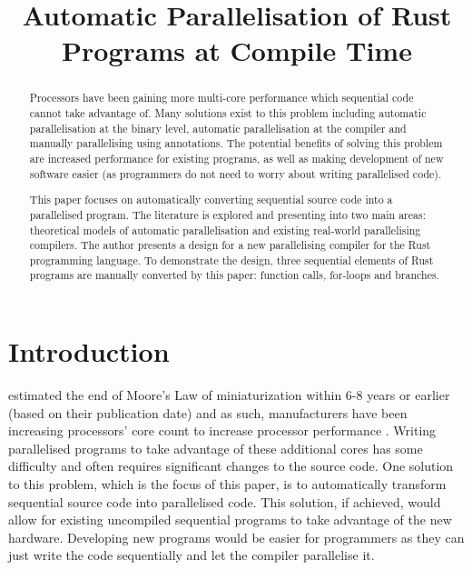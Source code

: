 \documentclass[conference]{IEEEtran}
\begin{document}
\title{Automatic Parallelisation of Rust Programs at Compile Time}

\author{
\and
{}
}

\maketitle

\begin{abstract}
  Processors have been gaining more multi-core performance which sequential code cannot take advantage of. Many solutions exist to this problem including automatic parallelisation at the binary level, automatic parallelisation at the compiler and manually parallelising using annotations. The potential benefits of solving this problem are increased performance for existing programs, as well as making development of new software easier (as programmers do not need to worry about writing parallelised code).

  This paper focuses on automatically converting sequential source code into a parallelised program. The literature is explored and presenting into two main areas: theoretical models of automatic parallelisation and existing real-world parallelising compilers.
  The author presents a design for a new parallelising compiler for the Rust programming language. To demonstrate the design, three sequential elements of Rust programs are manually converted by this paper: function calls, for-loops and branches.
\end{abstract}

\section{Introduction}
\textcite{Kish2002} estimated the end of Moore's Law of miniaturization within 6-8 years or earlier (based on their publication date) and as such, manufacturers have been increasing processors' core count to increase processor performance \parencite{Geer2005}. Writing parallelised programs to take advantage of these additional cores has some difficulty and often requires significant changes to the source code. One solution to this problem, which is the focus of this paper, is to automatically transform sequential source code into parallelised code. This solution, if achieved, would allow for existing uncompiled sequential programs to take advantage of the new hardware. Developing new programs would be easier for programmers as they can just write the code sequentially and let the compiler parallelise it.
\end{document}
